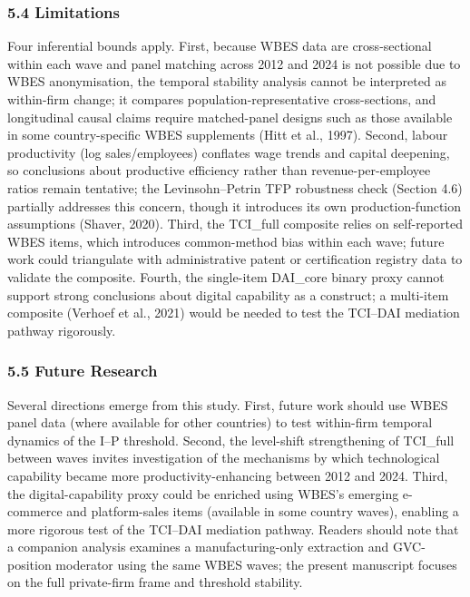 \documentclass[12pt,a4paper]{article}
\begin{document}
\hypertarget{54-limitations}{%
\subsubsection{5.4 Limitations}\label{54-limitations}}

Four inferential bounds apply. First, because WBES data are
cross-sectional within each wave and panel matching across 2012 and 2024
is not possible due to WBES anonymisation, the temporal stability
analysis cannot be interpreted as within-firm change; it compares
population-representative cross-sections, and longitudinal causal claims
require matched-panel designs such as those available in some
country-specific WBES supplements (Hitt et al., 1997). Second, labour
productivity (log sales/employees) conflates wage trends and capital
deepening, so conclusions about productive efficiency rather than
revenue-per-employee ratios remain tentative; the Levinsohn--Petrin TFP
robustness check (Section 4.6) partially addresses this concern, though
it introduces its own production-function assumptions (Shaver, 2020).
Third, the TCI\_full composite relies on self-reported WBES items, which
introduces common-method bias within each wave; future work could
triangulate with administrative patent or certification registry data to
validate the composite. Fourth, the single-item DAI\_core binary proxy
cannot support strong conclusions about digital capability as a
construct; a multi-item composite (Verhoef et al., 2021) would be needed
to test the TCI--DAI mediation pathway rigorously.

\hypertarget{55-future-research}{%
\subsubsection{5.5 Future Research}\label{55-future-research}}

Several directions emerge from this study. First, future work should use
WBES panel data (where available for other countries) to test
within-firm temporal dynamics of the I--P threshold. Second, the
level-shift strengthening of TCI\_full between waves invites
investigation of the mechanisms by which technological capability became
more productivity-enhancing between 2012 and 2024. Third, the
digital-capability proxy could be enriched using WBES's emerging
e-commerce and platform-sales items (available in some country waves),
enabling a more rigorous test of the TCI--DAI mediation pathway. Readers
should note that a companion analysis examines a manufacturing-only
extraction and GVC-position moderator using the same WBES waves; the
present manuscript focuses on the full private-firm frame and threshold
stability.
\end{document}
